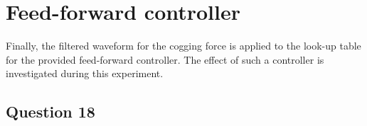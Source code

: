 \documentclass{scrartcl}
\newcommand\tab[1][0.5cm]{\hspace*{#1}}
\begin{document}
\section{Feed-forward controller}
\tab Finally, the filtered waveform for the cogging force is applied to the look-up table for the provided feed-forward controller. The effect of such a controller is investigated during this experiment.

	\subsection{Question 18}
    \label{8a}
    
    
\end{document}
